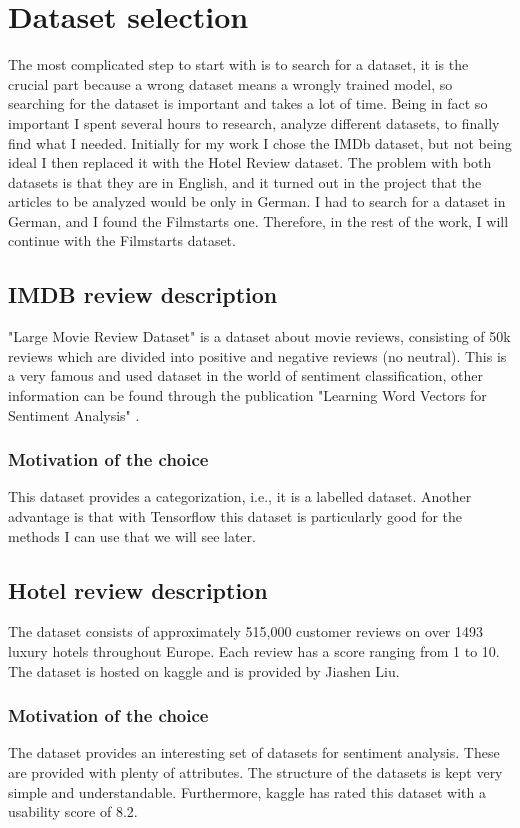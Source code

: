 \section{Dataset selection}
\label{chap:dataset}
The most complicated step to start with is to search for a dataset, it is the crucial part because a wrong dataset means a wrongly trained model, so searching for the dataset is important and takes a lot of time.
Being in fact so important I spent several hours to research, analyze different datasets, to finally find what I needed.
Initially for my work I chose the IMDb dataset, but not being ideal I then replaced it with the Hotel Review dataset. The problem with both datasets is that they are in English, and it turned out in the project that the articles to be analyzed would be only in German. I had to search for a dataset in German, and I found the Filmstarts one. Therefore, in the rest of the work, I will continue with the Filmstarts dataset.

\subsection{IMDB review description}
"Large Movie Review Dataset" \cite{noauthor_sentiment_nodate} is a dataset about movie reviews, consisting of 50k reviews which are divided into positive and negative reviews (no neutral).
This is a very famous and used dataset in the world of sentiment classification, other information can be found through the publication "Learning Word Vectors for Sentiment Analysis" \cite{maas-EtAl:2011:ACL-HLT2011}.

\subsubsection*{Motivation of the choice}
This dataset provides a categorization, i.e., it is a labelled dataset. Another advantage is that with \gls{Tensorflow} this dataset is particularly good for the methods I can use that we will see later.

\subsection{Hotel review description}
The dataset consists of approximately 515,000 customer reviews on over 1493 luxury hotels throughout Europe. Each review has a score ranging from 1 to 10. The dataset \cite{515k_kaggle} is hosted on \gls{kaggle} and is provided by Jiashen Liu.

\subsubsection*{Motivation of the choice}
The dataset provides an interesting set of datasets for sentiment analysis. These are provided with plenty of attributes. The structure of the datasets is kept very simple and understandable. Furthermore, \gls{kaggle} has rated this \gls{dataset} with a usability score of 8.2.

